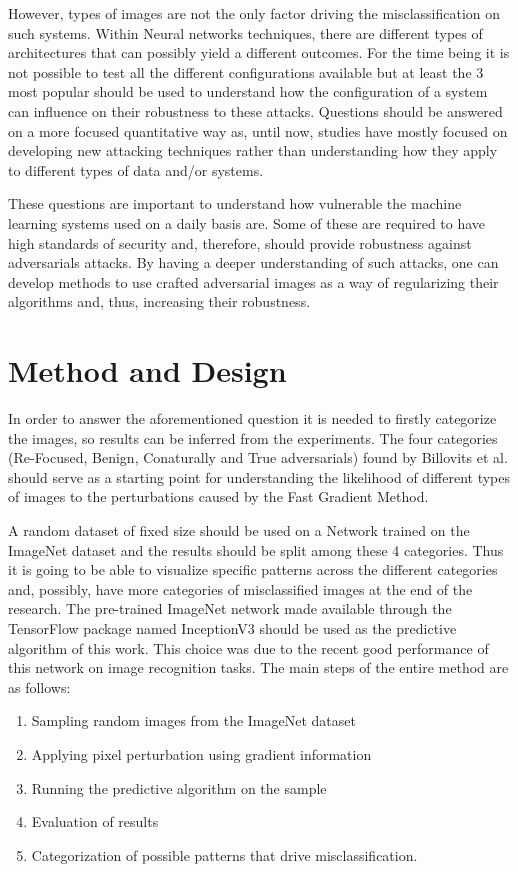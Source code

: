 \documentclass{article}
\begin{document}
However, types of images are not the only factor driving the misclassification on such systems. Within Neural networks techniques, there are different types of architectures that can possibly yield a different outcomes. For the time being it is not possible to test all the different configurations available but at least the 3 most popular should be used to understand how the configuration of a system can influence on their robustness to these attacks. Questions should be answered on a more focused quantitative way as, until now, studies have mostly focused on developing new attacking techniques rather than understanding how they apply to different types of data and/or systems.

These questions are important to understand how vulnerable the machine learning systems used on a daily basis are. Some of these are required to have high standards of security and, therefore, should provide robustness against adversarials attacks. By having a deeper understanding of such attacks, one can develop methods to use crafted adversarial images as a way of regularizing their algorithms and, thus, increasing their robustness.

\section{Method and Design} \label{sec: questions}

In order to answer the aforementioned question it is needed to firstly categorize the images, so results can be inferred from the experiments. The four categories (Re-Focused, Benign, Conaturally and True adversarials) found by Billovits et al. \cite{billovits} should serve as a starting point for understanding the likelihood of different types of images to the perturbations caused by the Fast Gradient Method. 

A random dataset of fixed size should be used on a Network trained on the ImageNet dataset and the results should be split among these 4 categories. Thus it is going to be able to visualize specific patterns across the different categories and, possibly, have more categories of misclassified images at the end of the research. The pre-trained ImageNet network made available through the TensorFlow package named InceptionV3 should be used as the predictive algorithm of this work. This choice was due to the recent good performance of this network on image recognition tasks. The main steps of the entire method are as follows:

\begin{enumerate}
\item Sampling random images from the ImageNet dataset
\item Applying pixel perturbation using gradient information
\item Running the predictive algorithm on the sample
\item Evaluation of results
\item Categorization of possible patterns that drive misclassification.
\end{enumerate}
\end{document}
